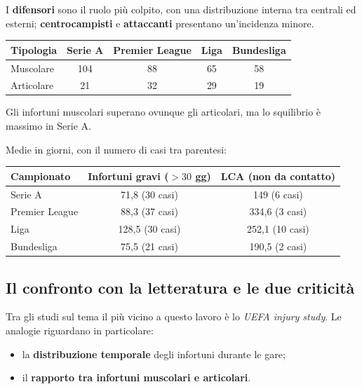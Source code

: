 I \textbf{difensori} sono il ruolo più colpito, con una distribuzione interna tra centrali ed
esterni; \textbf{centrocampisti} e \textbf{attaccanti} presentano un'incidenza minore.

\begin{table}[htbp]
  \centering
  \small
  \renewcommand{\arraystretch}{1.3}
  \begin{tabularx}{\textwidth}{|X|c|c|c|c|}
    \hline
    \textbf{Tipologia} & \textbf{Serie A} & \textbf{Premier League} & \textbf{Liga} &
      \textbf{Bundesliga} \\
    \hline
    Muscolare & 104 & 88 & 65 & 58 \\
    \hline
    Articolare & 21 & 32 & 29 & 19 \\
    \hline
  \end{tabularx}
\end{table}

Gli infortuni muscolari superano ovunque gli articolari, ma lo squilibrio è massimo in Serie A.

Medie in giorni, con il numero di casi tra parentesi:

\begin{table}[htbp]
  \centering
  \small
  \renewcommand{\arraystretch}{1.3}
  \begin{tabularx}{\textwidth}{|X|c|c|}
    \hline
    \textbf{Campionato} & \textbf{Infortuni gravi ($>30$ gg)} & \textbf{LCA (non da contatto)} \\
    \hline
    Serie A & 71,8 (30 casi) & 149 (6 casi) \\
    \hline
    Premier League & 88,3 (37 casi) & 334,6 (3 casi) \\
    \hline
    Liga & 128,5 (30 casi) & 252,1 (10 casi) \\
    \hline
    Bundesliga & 75,5 (21 casi) & 190,5 (2 casi) \\
    \hline
  \end{tabularx}
\end{table}

\subsection{Il confronto con la letteratura e le due criticità}

Tra gli studi sul tema il più vicino a questo lavoro è lo \textit{UEFA injury study}. Le analogie
riguardano in particolare:
\begin{itemize}
  \item la \textbf{distribuzione temporale} degli infortuni durante le gare;
  \item il \textbf{rapporto tra infortuni muscolari e articolari}.
\end{itemize}

